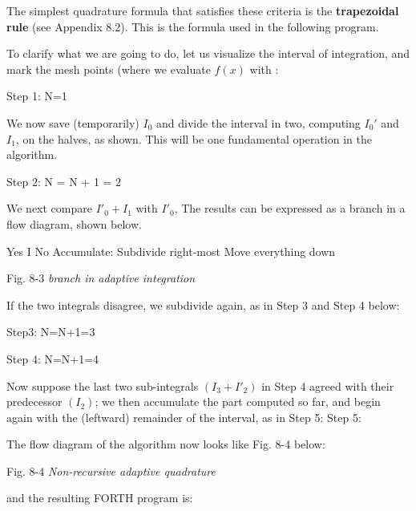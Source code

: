 The simplest quadrature formula that satisfies these criteria is the \textbf{trapezoidal rule} (see Appendix 8.2). This is the formula used in the following program.

To clarify what we are going to do, let us visualize the interval of integration, and mark the mesh points (where we evaluate $f(x)$ with \bc{+}:

Step 1: N=1

We now save (temporarily) $I_0$ and divide the interval in two, computing $I_{0}'$ and $I_1$, on the halves, as shown. This will be one fundamental operation in the algorithm.

Step 2: N = N + 1 = 2

We next compare $I'_0 + I_1$ with $I'_0$, The results can be expressed as a branch in a flow diagram, shown below.

Yes I No
Accumulate: Subdivide right-most
Move everything down

Fig. 8-3  \textit{branch in adaptive integration}

If the two integrals disagree, we subdivide again, as in Step 3 and
Step 4 below:

Step3: N=N+1=3

Step 4: N=N+1=4

Now suppose the last two sub-integrals $(I_3 + I'_2)$ in Step 4 agreed with their predecessor $(I_2)$; we then accumulate the part computed so far, and begin again with the (leftward) remainder of the interval, as in Step 5:
Step 5:

The flow diagram of the algorithm now looks like Fig. 8-4 below:

Fig. 8-4 \textit{Non-recursive adaptive quadrature}

and the resulting FORTH program is:

